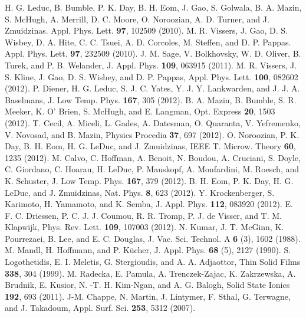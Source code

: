 \documentclass{report}
\begin{document}
\begin{thebibliography}{99}
H. G. Leduc, B. Bumble, P. K. Day, B. H. Eom, J. Gao, S. Golwala, B. A. Mazin, S. McHugh, A. Merrill, D. C. Moore, O. Noroozian, A. D. Turner, and J. Zmuidzinas. Appl. Phys. Lett. \textbf{97}, 102509 (2010).
M. R. Vissers, J. Gao, D. S. Wisbey, D. A. Hite, C. C. Tsuei, A. D. Corcoles, M. Steffen, and D. P. Pappas. Appl. Phys. Lett. \textbf{97}, 232509 (2010).
J. M. Sage, V. Bolkhovsky, W. D. Oliver, B. Turek, and P. B. Welander, J. Appl. Phys. \textbf{109}, 063915 (2011).
M. R. Vissers, J. S. Kline, J. Gao, D. S. Wisbey, and D. P. Pappas, Appl. Phys. Lett. \textbf{100}, 082602 (2012).
P. Diener, H. G. Leduc, S. J. C. Yates, Y. J. Y. Lankwarden, and J. J. A. Baselmans, J. Low Temp. Phys. \textbf{167}, 305 (2012).
B. A. Mazin, B. Bumble, S. R. Meeker, K. O' Brien, S. McHugh, and E. Langman, Opt. Express \textbf{20}, 1503 (2012).
T. Cecil, A. Miceli, L. Gades, A. Datesman, O. Quaranta, V. Yefremenko, V. Novosad, and B. Mazin, Physics Procedia \textbf{37}, 697 (2012).
O. Noroozian, P. K. Day, B. H. Eom, H. G. LeDuc, and J. Zmuidzinas, IEEE T. Microw. Theory \textbf{60}, 1235 (2012).
M. Calvo, C. Hoffman, A. Benoit, N. Boudou, A. Cruciani, S. Doyle, C. Giordano, C. Hoarau, H. LeDuc, P. Mauskopf, A. Monfardini, M. Roesch, and K. Schuster, J. Low Temp. Phys. \textbf{167}, 379 (2012).
B. H. Eom, P. K. Day, H. G. LeDuc, and J. Zmuidzinas, Nat. Phys. \textbf{8}, 623 (2012).
Y. Krockenberger, S. Karimoto, H. Yamamoto, and K. Semba, J. Appl. Phys. \textbf{112}, 083920 (2012).
E. F. C. Driessen, P. C. J. J. Coumou, R. R. Tromp, P. J. de Visser, and T. M. Klapwijk, Phys. Rev. Lett. \textbf{109}, 107003 (2012).
N. Kumar, J. T. McGinn, K. Pourrezaei, B. Lee, and E. C. Douglas, J. Vac. Sci. Technol. A \textbf{6} (3), 1602 (1988).
M. Mandl, H. Hoffmann, and P. K\"{u}cher, J. Appl. Phys. \textbf{68} (5), 2127 (1990).
S. Logothetidis, E. I. Meletis, G. Stergioudis, and A. A. Adjaottor, Thin Solid Films \textbf{338}, 304 (1999).
M. Radecka, E. Pamula, A. Trenczek-Zajac, K. Zakrzewska, A. Brudnik, E. Kusior, N. -T. H. Kim-Ngan, and A. G. Balogh, Solid State Ionics \textbf{192}, 693 (2011).
J-M. Chappe, N. Martin, J. Lintymer, F. Sthal, G. Terwagne, and J. Takadoum, Appl. Surf. Sci. \textbf{253}, 5312 (2007).

\end{thebibliography}
\end{document}
